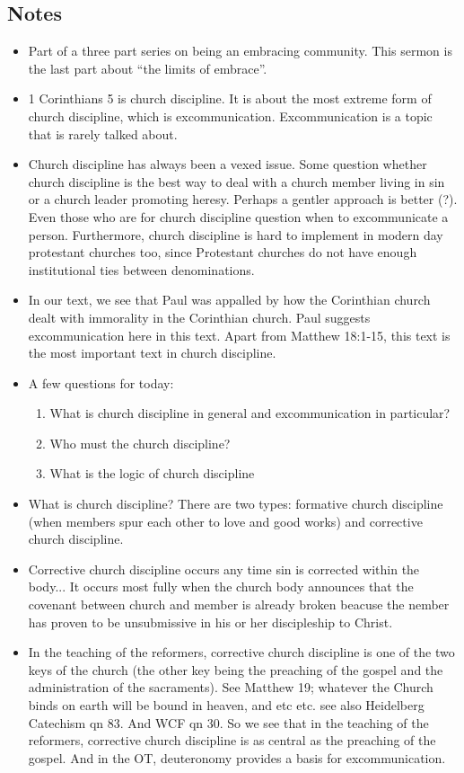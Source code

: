 \subsection*{Notes}
\begin{itemize}
  \item{Part of a three part series on being an embracing community. This sermon is the last part about “the limits of embrace”. }
  \item{1 Corinthians 5 is church discipline. It is about the most extreme form of church discipline, which is excommunication. Excommunication is a topic that is rarely talked about.}
  \item{Church discipline has always been a vexed issue. Some question whether church discipline is the best way to deal with a church member living in sin or a church leader promoting heresy. Perhaps a gentler approach is better (?). Even those who are for church discipline question when to excommunicate a person. Furthermore, church discipline is hard to implement in modern day protestant churches too, since Protestant churches do not have enough institutional ties between denominations.}
  \item{In our text, we see that Paul was appalled by how the Corinthian church dealt with immorality in the Corinthian church. Paul suggests excommunication here in this text. Apart from Matthew 18:1-15, this text is the most important text in church discipline.}
  \item{A few questions for today:
  \begin{enumerate}
    \item{What is church discipline in general and excommunication in particular?}
    \item{Who must the church discipline?}
    \item{What is the logic of church discipline}
  \end{enumerate}}
  \item{What is church discipline? There are two types: formative church discipline (when members spur each other to love and good works) and corrective church discipline. }
  \item{Corrective church discipline occurs any time sin is corrected within the body... It occurs most fully when the church body announces that the covenant between church and member is already broken beacuse the nember has proven to be unsubmissive in his or her discipleship to Christ.}
  \item{In the teaching of the reformers, corrective church discipline is one of the two keys of the church (the other key being the preaching of the gospel and the administration of the sacraments). See Matthew 19; whatever the Church binds on earth will be bound in heaven, and etc etc. see also Heidelberg Catechism qn 83. And WCF qn 30. So we see that in the teaching of the reformers, corrective church discipline is as central as the preaching of the gospel. And in the OT, deuteronomy provides a basis for excommunication.}

\end{itemize}
